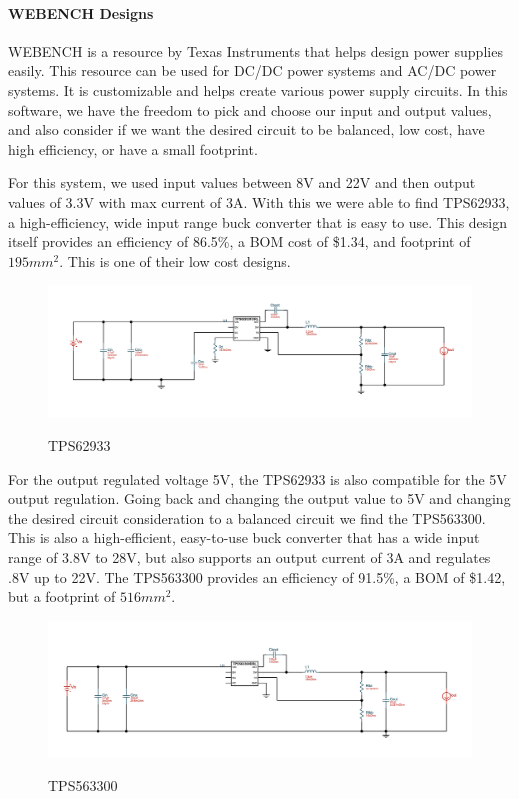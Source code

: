 \paragraph{WEBENCH Designs}
 WEBENCH is a resource by Texas Instruments that helps design power supplies easily. This resource can be used for DC/DC power systems and AC/DC power systems. It is customizable and helps create various power supply circuits. In this software, we have the freedom to pick and choose our input and output values, and also consider if we want the desired circuit to be balanced, low cost, have high efficiency, or have a small footprint. \par
 For this system, we used input values between 8V and 22V and then output values of 3.3V with max current of 3A. With this we were able to find TPS62933, a high-efficiency, wide input range buck converter that is easy to use. This design itself provides an efficiency of 86.5\%, a BOM cost of \$1.34, and footprint of $195mm^2$. This is one of their low cost designs.\par
 \begin{figure}[H]
    \centering
    \caption{TPS62933}
    \includegraphics[width=\textwidth]{images/TPS62933.png}
    \label{fig:WEBENCH Design TPS62933}
\end{figure}
For the output regulated voltage 5V, the TPS62933 is also compatible for the 5V output regulation. Going back and changing the output value to 5V and changing the desired circuit consideration to a balanced circuit we find the TPS563300. This is also a high-efficient, easy-to-use buck converter that has a wide input range of 3.8V to 28V, but also supports an output current of 3A and regulates .8V up to 22V. The TPS563300 provides an efficiency of 91.5\%, a BOM of \$1.42, but a footprint of $516mm^2$. \par
\begin{figure}[H]
    \centering
    \caption{TPS563300}
    \includegraphics[width=\textwidth]{images/TPS563300.png}
    \label{fig:WEBENCH Design TPS563300}
\end{figure}
